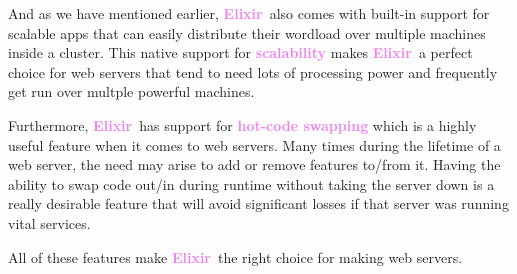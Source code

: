 \documentclass[12pt]{article}
\newcommand{\vio}[1]{\textbf{\textcolor{violet}{#1}}}
\newcommand{\elix}{\vio{Elixir}}
\begin{document}
And as we have mentioned earlier, \elix\ also comes with built-in support for scalable apps that can easily distribute their wordload over multiple machines inside a cluster. This native support for \vio{scalability} makes \elix\ a perfect choice for web servers that tend to need lots of processing power and frequently get run over multple powerful machines. \par

Furthermore, \elix\ has support for \vio{hot-code swapping} which is a highly useful feature when it comes to web servers. Many times during the lifetime of a web server, the need may arise to add or remove features to/from it. Having the ability to swap code out/in during runtime without taking the server down is a really desirable feature that will avoid significant losses if that server was running vital services. \par

\vspace{2em}

All of these features make \elix\ the right choice for making web servers. \par
\end{document}
